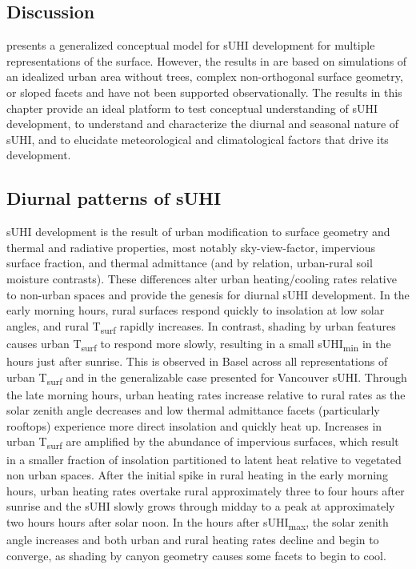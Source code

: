 \begin{bibunit}
\section{Discussion}
\citet{Oke2017} presents a generalized conceptual model for sUHI development for multiple representations of the surface. However, the results in \citet{Oke2017} are based on simulations of an idealized urban area without trees, complex non-orthogonal surface geometry, or sloped facets and have not been supported observationally. The results in this chapter provide an ideal platform to test conceptual understanding of sUHI development, to understand and characterize the diurnal and seasonal nature of sUHI, and to elucidate meteorological and climatological factors that drive its development.

\subsection{Diurnal patterns of sUHI}
\label{gen}

sUHI development is the result of urban modification to surface geometry and thermal and radiative properties, most notably sky-view-factor, impervious surface fraction, and thermal admittance (and by relation, urban-rural soil moisture contrasts). These differences alter urban heating/cooling rates relative to non-urban spaces and provide the genesis for diurnal sUHI development. In the early morning hours, rural surfaces respond quickly to insolation at low solar angles, and rural T\textsubscript{surf} rapidly increases. In contrast, shading by urban features causes urban T\textsubscript{surf} to respond more slowly, resulting in a small sUHI\textsubscript{min} in the hours just after sunrise. This is observed in Basel across all representations of urban T\textsubscript{surf} and in the generalizable case presented for Vancouver sUHI. Through the late morning hours, urban heating rates increase relative to rural rates as the solar zenith angle decreases and low thermal admittance facets (particularly rooftops) experience more direct insolation and quickly heat up. Increases in urban T\textsubscript{surf} are amplified by the abundance of impervious surfaces, which result in a smaller fraction of insolation partitioned to latent heat relative to vegetated non urban spaces. After the initial spike in rural heating in the early morning hours, urban heating rates overtake rural approximately three to four hours after sunrise and the sUHI slowly grows through midday to a peak at approximately two hours hours after solar noon. In the hours after sUHI\textsubscript{max}, the solar zenith angle increases and both urban and rural heating rates decline and begin to converge, as shading by canyon geometry causes some facets to begin to cool.


\end{bibunit}
